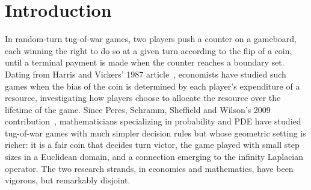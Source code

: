 \documentclass[letterpaper,11pt,oneside,reqno]{amsbook}
\newcommand{\Z}{\ensuremath{\mathbb{Z}}}
\numberwithin{figure}{chapter}
\theoremstyle{definition}
\theoremstyle{definition}
\theoremstyle{definition}
\theoremstyle{definition}
\theoremstyle{definition}
\begin{document}
\begin{abstract}
\end{abstract}


\medskip



\maketitle


\setcounter{tocdepth}{2}
\tableofcontents




\chapter{Introduction} 






In random-turn tug-of-war games,
two players push a counter on a gameboard, each winning the right to do so at a given turn according to the flip of a coin, until a terminal payment is made when the counter reaches a boundary set. 
Dating from Harris and Vickers' 1987 article~\cite{HarrisVickers87}, economists have studied such games when the bias of the coin is determined by each player's expenditure of a resource, investigating how players choose to allocate the resource over the lifetime of the game. Since Peres, Schramm, Sheffield and Wilson's 2009 contribution~\cite{PSSW09}, mathematicians specializing in probability and PDE have studied tug-of-war games with much simpler decision rules but whose geometric setting is richer: it is a fair coin that decides turn victor, the game played with small step sizes in a Euclidean domain, and a connection emerging to the infinity Laplacian operator. The two research strands, in economics and mathematics, have been vigorous, but remarkably disjoint. 
\end{document}
